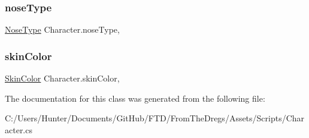 \mbox{\label{class_character_a451957556cb1b0aaa89b9dcf36b2b1dd}} 
\subsubsection{\texorpdfstring{noseType}{noseType}}
{\footnotesize\ttfamily \mbox{\hyperlink{class_character_a638a71f8525dc3a59596f7f4a7836036}{Nose\+Type}} Character.\+nose\+Type\hspace{0.3cm}{\ttfamily [get]}, {\ttfamily [set]}}

\mbox{\label{class_character_af3528fb3651c738431375d8c39b4651c}} 
\subsubsection{\texorpdfstring{skinColor}{skinColor}}
{\footnotesize\ttfamily \mbox{\hyperlink{class_character_a726214a0fe480fffada7772697764824}{Skin\+Color}} Character.\+skin\+Color\hspace{0.3cm}{\ttfamily [get]}, {\ttfamily [set]}}



The documentation for this class was generated from the following file\+:\begin{DoxyCompactItemize}
\item 
C\+:/\+Users/\+Hunter/\+Documents/\+Git\+Hub/\+F\+T\+D/\+From\+The\+Dregs/\+Assets/\+Scripts/Character.\+cs\end{DoxyCompactItemize}

